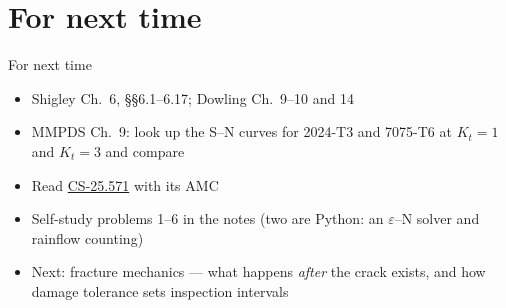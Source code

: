 \documentclass[aspectratio=169,10pt]{beamer}
\begin{document}
\section{For next time}

\begin{frame}{For next time}
\begin{itemize}
  \item Shigley Ch.\ 6, \S\S6.1--6.17; Dowling Ch.\ 9--10 and 14
  \item MMPDS Ch.\ 9: look up the S--N curves for 2024-T3 and 7075-T6 at $K_t=1$ and $K_t=3$ and compare
  \item Read \href{https://www.easa.europa.eu/en/document-library/easy-access-rules/online-publications/easy-access-rules-large-aeroplanes-cs-25}{CS-25.571} with its AMC
  \item Self-study problems 1--6 in the notes (two are Python: an $\varepsilon$--N solver and rainflow counting)
  \item Next: fracture mechanics --- what happens \emph{after} the crack exists, and how damage tolerance sets inspection intervals
\end{itemize}
\end{frame}
\end{document}
